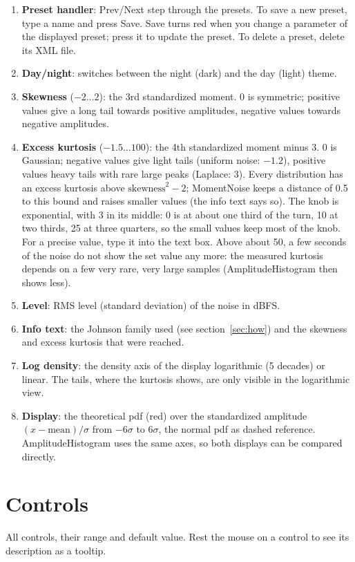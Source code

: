 \documentclass[12pt]{article}
\begin{document}
\begin{enumerate}
    \item \textbf{Preset handler}: Prev/Next step through the presets. To save a new preset,
    type a name and press Save. Save turns red when you change a parameter of the displayed
    preset; press it to update the preset. To delete a preset, delete its XML file.
    \item \textbf{Day/night}: switches between the night (dark) and the day (light) theme.
    \item \textbf{Skewness} ($-2 \dots 2$): the 3rd standardized moment. 0 is symmetric; positive values
    give a long tail towards positive amplitudes, negative values towards negative amplitudes.
    \item \textbf{Excess kurtosis} ($-1.5 \dots 100$): the 4th standardized moment minus 3. 0 is Gaussian;
    negative values give light tails (uniform noise: $-1.2$), positive values heavy tails with rare
    large peaks (Laplace: 3). Every distribution has an excess kurtosis above
    $\text{skewness}^2 - 2$; MomentNoise keeps a distance of 0.5 to this bound and raises smaller values
    (the info text says so).
    The knob is exponential, with 3 in its middle: 0 is at about one third of the turn, 10 at two
    thirds, 25 at three quarters, so the small values keep most of the knob. For a precise value,
    type it into the text box.
    Above about 50, a few seconds of the noise do not show the set value any more: the measured
    kurtosis depends on a few very rare, very large samples (AmplitudeHistogram then shows less).
    \item \textbf{Level}: RMS level (standard deviation) of the noise in dBFS.
    \item \textbf{Info text}: the Johnson family used (see section~\ref{sec:how}) and the skewness and
    excess kurtosis that were reached.
    \item \textbf{Log density}: the density axis of the display logarithmic (5 decades) or linear. The
    tails, where the kurtosis shows, are only visible in the logarithmic view.
    \item \textbf{Display}: the theoretical pdf (red) over the standardized amplitude
    $(x - \text{mean})/\sigma$ from $-6\sigma$ to $6\sigma$, the normal pdf as dashed reference.
    AmplitudeHistogram uses the same axes, so both displays can be compared directly.
\end{enumerate}

\section{Controls}\label{sec:controls}
All controls, their range and default value. Rest the mouse on a control to see its
description as a tooltip.
\end{document}
